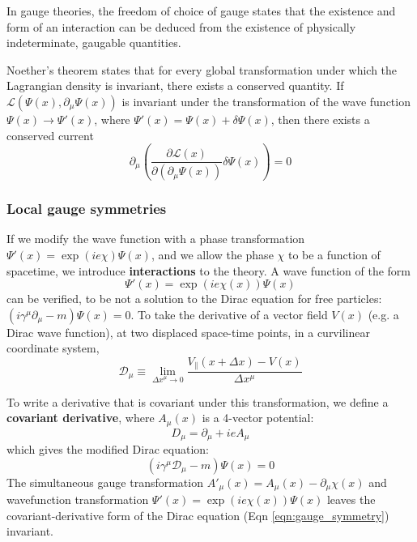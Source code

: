 \documentclass{article}
\begin{document}
In gauge theories, the freedom of choice of gauge states that the existence and form of an interaction can be deduced from the existence of physically indeterminate, gaugable quantities.

Noether's theorem states that for every global transformation under which the Lagrangian density is invariant, there exists a conserved quantity. If $\mathcal{L}(\Psi(x), \partial_\mu \Psi(x))$ is invariant under the transformation of the wave function $\Psi(x) \rightarrow \Psi'(x)$, where $\Psi'(x) = \Psi(x) + \delta \Psi(x)$, then there exists a conserved current 
\begin{equation}
    \partial_\mu \left( \frac{\partial\mathcal{L}(x)}{\partial(\partial_\mu \Psi(x))} \delta \Psi(x)  \right) = 0
\end{equation}


\subsubsection{Local gauge symmetries}
If we modify the wave function with a phase transformation $\Psi'(x) = \exp(i e \chi) \Psi(x)$, and we allow the phase $\chi$ to be a function of spacetime, we introduce \textbf{interactions} to the theory. A wave function of the form
\begin{equation}
    \Psi'(x) = \exp(i e \chi(x)) \Psi(x)
\end{equation}
can be verified, to be not a solution to the Dirac equation for free particles: $(i \gamma^\mu \partial_\mu - m) \Psi(x) = 0$. To take the derivative of a vector field $V(x)$ (e.g. a Dirac wave function), at two displaced space-time points, in a curvilinear coordinate system, 
\begin{equation}
    \mathcal{D}_\mu \equiv \lim_{\Delta x^\mu \rightarrow 0} \frac{V_{\parallel}(x + \Delta x) - V(x)}
{\Delta x^\mu}\end{equation}

To write a derivative that is covariant under this transformation, we define a \textbf{covariant derivative}, where $A_\mu(x)$ is a 4-vector potential:
\begin{equation}
    D_\mu = \partial_\mu + i e A_\mu
\label{eqn:modified_dirac}
\end{equation}
which gives the modified Dirac equation:
\begin{equation}
    \left( i \gamma^\mu \mathcal{D}_\mu - m  \right) \Psi(x) = 0
\end{equation}
The simultaneous gauge transformation $A'_\mu(x) = A_\mu(x) - \partial_\mu\chi(x)$ and wavefunction transformation $\Psi'(x) = \exp(ie\chi(x)) \Psi(x)$ leaves the covariant-derivative form of the Dirac equation (Eqn \ref{eqn:gauge_symmetry}) invariant.
\end{document}
